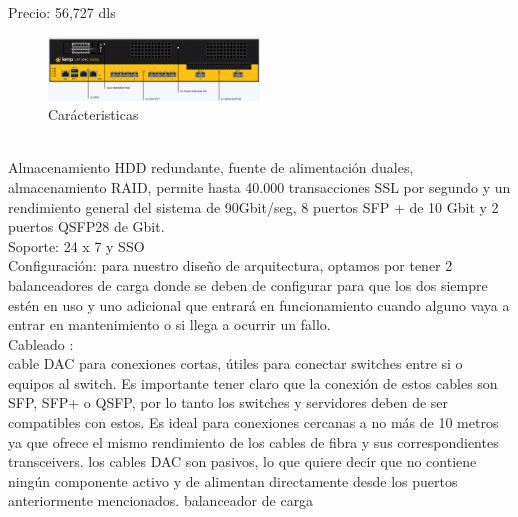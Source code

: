Precio: 56,727 dls\\
\begin{figure}[htb]
\centering
\includegraphics[width=0.5\textwidth]{assets/ca.png}
\caption{Carácteristicas}
\label{fig:modelo}
\end{figure}
\label{sec:Background} \\

Almacenamiento HDD redundante, fuente de alimentación duales, almacenamiento RAID, permite hasta 40.000 transacciones SSL por segundo 
y un rendimiento general del sistema de 90Gbit/seg, 8 puertos SFP + de 10 Gbit y 2 puertos QSFP28 de Gbit.\\

Soporte: 24 x 7 y SSO\\

Configuración: para nuestro diseño de arquitectura, optamos por tener 2 balanceadores de carga donde se deben de configurar 
para que los dos siempre estén en uso y uno adicional que entrará en funcionamiento cuando alguno vaya a entrar en mantenimiento o si llega a ocurrir un fallo.\\

Cableado :\\

cable DAC para conexiones cortas, útiles para conectar switches entre si o equipos al switch. 
Es importante tener claro que la conexión de estos cables son SFP, SFP+ o QSFP, 
por lo tanto los switches y servidores deben de ser compatibles con estos. 
Es ideal para conexiones cercanas a no más de 10 metros ya que ofrece el mismo rendimiento de los cables de fibra y sus correspondientes transceivers. 
los cables DAC son pasivos, lo que quiere decir que no contiene ningún componente activo y de alimentan directamente desde los puertos anteriormente mencionados.
balanceador de carga

